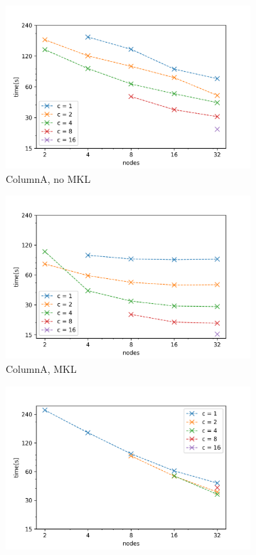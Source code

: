 \documentclass{article}
\begin{document}
\begin{figure}[ht!]
    \centering
    \begin{subfigure}[b]{0.45\textwidth}
        \includegraphics[width=\textwidth]{charts/s_100000_100_2}
        \caption{ColumnA, no MKL}
    \end{subfigure}
    \begin{subfigure}[b]{0.45\textwidth}
        \includegraphics[width=\textwidth]{charts/s_100000_100_2_m}
        \caption{ColumnA, MKL}
    \end{subfigure}
    \begin{subfigure}[b]{0.45\textwidth}
        \includegraphics[width=\textwidth]{charts/s_100000_100_2_i}

\end{subfigure}
\end{figure}
\end{document}
